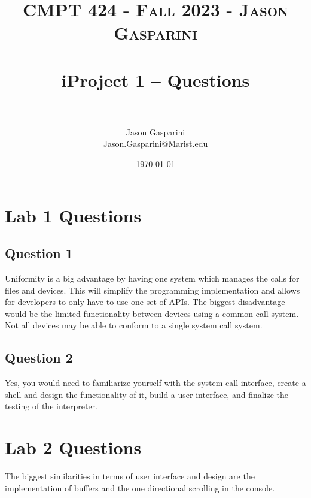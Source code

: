 \documentclass[letterpaper, 10pt]{article}
\title{	
   \normalfont \normalsize 
   \textsc{CMPT 424 - Fall 2023 - Jason Gasparini} \\[10pt] %
   \horrule{0.5pt} \\[0.25cm] 	%
   \huge iProject 1 -- Questions \\     	    %
   \horrule{0.5pt} \\[0.25cm] 	%
}
\author{Jason Gasparini \\ \normalsize Jason.Gasparini@Marist.edu}
\date{\normalsize\today} 	%
\begin{document}
\maketitle %



\section{Lab 1 Questions}
\subsection{Question 1}
Uniformity is a big advantage by having one system which manages the calls for files and devices. This will simplify the programming implementation and allows for developers to only have to use one set of APIs. The biggest disadvantage would be the limited functionality between devices using a common call system. Not all devices may be able to conform to a single system call system.

\noindent

\vspace{2em}


\subsection{Question 2}
Yes, you would need to familiarize yourself with the system call interface, create a shell and design the functionality of it, build a user interface, and finalize the testing of the interpreter.


\section{Lab 2 Questions}

The biggest similarities in terms of user interface and design are the implementation of buffers and the one directional scrolling in the console.
\end{document}
